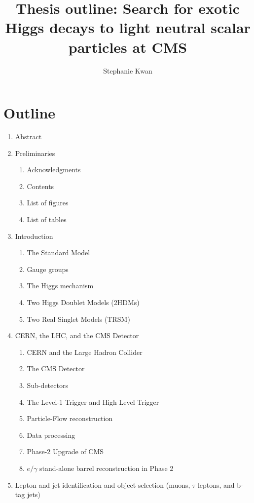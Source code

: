 \documentclass{article}
\title{Thesis outline: Search for exotic Higgs decays to light neutral scalar particles at CMS}
\author{Stephanie Kwan}
\begin{document}
\maketitle

\section{Outline}

\begin{enumerate}
    \item Abstract
    \item Preliminaries
        \begin{enumerate}
            \item Acknowledgments
            \item Contents
            \item List of figures
            \item List of tables
        \end{enumerate}
    \item Introduction
        \begin{enumerate}
            \item The Standard Model
            \item Gauge groups
            \item The Higgs mechanism
            \item Two Higgs Doublet Models (2HDMs)
            \item Two Real Singlet Models (TRSM)
        \end{enumerate}
    \item CERN, the LHC, and the CMS Detector
        \begin{enumerate}
            \item CERN and the Large Hadron Collider
            \item The CMS Detector
            \item Sub-detectors
            \item The Level-1 Trigger and High Level Trigger
            \item Particle-Flow reconstruction
            \item Data processing 
            \item Phase-2 Upgrade of CMS
            \item $e/\gamma$ stand-alone barrel reconstruction in Phase 2
        \end{enumerate}
    \item Lepton and jet identification and object selection (muons, $\tau$ leptons, and b-tag jets)

\end{enumerate}
\end{document}

